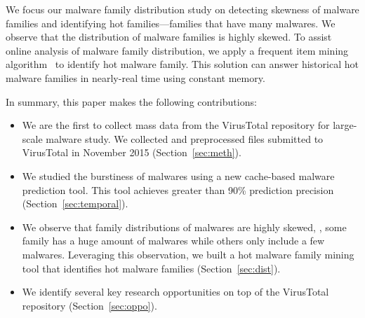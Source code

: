 We focus our malware family distribution study on detecting skewness of malware families and identifying hot families---families that have many malwares.
We observe that the distribution of malware families is highly skewed. 
To assist online analysis of malware family distribution, 
we apply a frequent item mining algorithm~\cite{space-saving} to identify hot malware family. 
This solution can answer historical hot malware families in nearly-real time using constant memory. 





In summary, this paper makes the following contributions:

\begin{itemize}

\item We are the first to collect mass data from the VirusTotal repository for large-scale malware study.
We collected and preprocessed files submitted to VirusTotal in November 2015 (Section~\ref{sec:meth}).

\item We studied the burstiness of malwares using a new 
cache-based malware prediction tool.
This tool achieves greater than 90\% prediction precision (Section~\ref{sec:temporal}). 

\item We observe that family distributions of malwares are highly skewed, 
\ie, some family has a huge amount of malwares while others only include a few malwares. 
Leveraging this observation, we built a hot malware family mining tool that identifies hot 
malware families (Section~\ref{sec:dist}).

\item We identify several key research opportunities on top of the VirusTotal repository (Section~\ref{sec:oppo}). 

\end{itemize}


